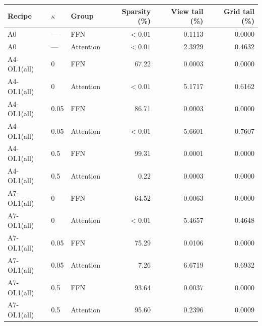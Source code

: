 \begin{tabular}{@{}lllrrr@{}}
\toprule
Recipe & $\kappa$ & Group & Sparsity (\%) & View tail (\%) & Grid tail (\%) \\
\midrule
A0 & --- & FFN & $<0.01$ & 0.1113 & 0.0000 \\
A0 & --- & Attention & $<0.01$ & 2.3929 & 0.4632 \\
A4-OL1(all) & 0 & FFN & 67.22 & 0.0003 & 0.0000 \\
A4-OL1(all) & 0 & Attention & $<0.01$ & 5.1717 & 0.6162 \\
A4-OL1(all) & 0.05 & FFN & 86.71 & 0.0003 & 0.0000 \\
A4-OL1(all) & 0.05 & Attention & $<0.01$ & 5.6601 & 0.7607 \\
A4-OL1(all) & 0.5 & FFN & 99.31 & 0.0001 & 0.0000 \\
A4-OL1(all) & 0.5 & Attention & 0.22 & 0.0003 & 0.0000 \\
A7-OL1(all) & 0 & FFN & 64.52 & 0.0063 & 0.0000 \\
A7-OL1(all) & 0 & Attention & $<0.01$ & 5.4657 & 0.4648 \\
A7-OL1(all) & 0.05 & FFN & 75.29 & 0.0106 & 0.0000 \\
A7-OL1(all) & 0.05 & Attention & 7.26 & 6.6719 & 0.6932 \\
A7-OL1(all) & 0.5 & FFN & 93.64 & 0.0037 & 0.0000 \\
A7-OL1(all) & 0.5 & Attention & 95.60 & 0.2396 & 0.0009 \\
\bottomrule
\end{tabular}
